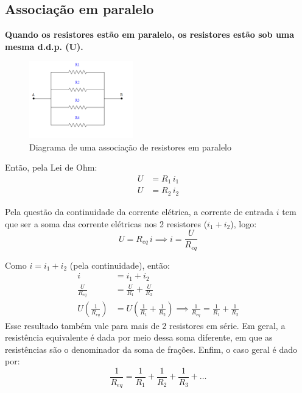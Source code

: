 \documentclass[12pt]{extarticle}
\newcommand{\<}{\langle}
\renewcommand{\>}{\rangle}
\theoremstyle{definition}
\begin{document}
\subsection{Associação em paralelo}
\textbf{Quando os resistores estão em paralelo, os resistores estão sob uma mesma d.d.p. (U).} 
\begin{figure}[H]
    \centering
    \includegraphics[width=0.4\textwidth]{resistencia_em_paralelo.png}
    \caption{Diagrama de uma associação de resistores em paralelo}
    \label{fig:paralelo}
\end{figure}

Então, pela Lei de Ohm:
\begin{equation}
    \begin{split}
        U &=R_1\,i_1\\
        U &=R_2\,i_2
    \end{split}
\end{equation}

Pela questão da continuidade da corrente elétrica, a corrente de entrada $i$ tem que ser a soma das corrente elétricas nos 2 resistores ($i_1 + i_2$), logo:
\begin{equation}
    U = R_{eq}\,i \implies i=\frac{U}{R_{eq}}
\end{equation}

Como $i=i_1+i_2$ (pela continuidade), então:
\begin{equation}
    \begin{split}
        i &= i_1+i_2 \\
        \frac{U}{R_{eq}} &= \frac{U}{R_1} + \frac{U}{R_2}\\
        U\left(\frac{1}{R_{eq}}\right) &= U\left(\frac{1}{R_1}+\frac{1}{R_2}\right) \implies \boxed{\frac{1}{R_{eq}} = \frac{1}{R_1}+\frac{1}{R_2}}
    \end{split}
\end{equation}
Esse resultado também vale para mais de 2 resistores em série. Em geral, a resistência equivalente é dada por meio dessa soma diferente, em que as resistências são o denominador da soma de frações. Enfim, o caso geral é dado por:
\begin{equation}
    \frac{1}{R_{eq}} = \frac{1}{R_1} + \frac{1}{R_2} + \frac{1}{R_3} + \dots
\end{equation}
\end{document}
